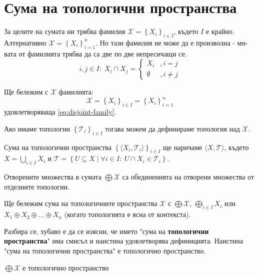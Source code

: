 \section{Сума на топологични пространства}
За целите на сумата ни трябва фамилия $\mathcal X = \left\{X_i\right\}_{i \in I}$, където $I$ е крайно. Алтернативно $\mathcal X = \left\{X_i\right\}_{i=1}^{n}$. Но тази фамилия не може да е произволна - мн-вата от фамилията трябва да са две по две непресичащи се.
\begin{equation} \label{eq:disjoint-family}
    i,j \in I:\; X_i \cap X_j = \begin{cases}
        X_i       & , i=j     \\
        \emptyset & , i\neq j
    \end{cases}
\end{equation}
\begin{notation}
    Ще бележим с $\mathcal X$ фамилията:
    \begin{equation*}
        \mathcal X = \left\{X_i\right\}_{i \in I} = \left\{X_i\right\}_{i=1}^{n}
    \end{equation*}
    удовлетворяваща \eqref{eq:disjoint-family}.
\end{notation}

Ако имаме топологии $\left\{\mathcal T_i\right\}_{i \in I}$ тогава можем да дефинираме топология над $\mathcal X$.
\begin{definition}\label{def:sum-topologies}
    Сума на топологични пространства $\left\{\langle X_i, \mathcal T_i\rangle\right\}_{i \in I}$ ще наричаме $\langle X, \mathcal T\rangle$, където $X = \bigcup\limits_{i\in I}X_i$ и $\mathcal T = \left\{ U \subseteq X \mid \forall i \in I:\; U \cap X_i \in \mathcal T_i \right\}$.
\end{definition}
\begin{fact}
    Отворените множества в сумата $\bigoplus \mathcal X$ са обединенията на отворени множества от отделните топологии.
\end{fact}
\begin{notation}
    Ще бележим сума на топологичните пространства $\mathcal X$ с $\bigoplus \mathcal X$, $\bigoplus\limits_{i\in I} X_i$ или $X_1 \oplus X_2 \oplus \dots \oplus X_n$ (когато топологията е ясна от контекста).
\end{notation}
Разбира се, хубаво е да се изясни, че името "сума на \textbf{топологични пространства}" има смисъл и наистина удовлетворява дефиницията. Наистина "сума на топологични пространства" е топологично пространство.
\begin{lemma}
    $\bigoplus \mathcal X$ е топологично пространство
\end{lemma}

